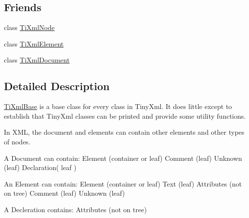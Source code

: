 \subsection*{Friends}
\begin{DoxyCompactItemize}
\item 
class \hyperlink{class_ti_xml_base_a218872a0d985ae30e78c55adc4bdb196}{Ti\-Xml\-Node}
\item 
class \hyperlink{class_ti_xml_base_ab6592e32cb9132be517cc12a70564c4b}{Ti\-Xml\-Element}
\item 
class \hyperlink{class_ti_xml_base_a173617f6dfe902cf484ce5552b950475}{Ti\-Xml\-Document}
\end{DoxyCompactItemize}


\subsection{Detailed Description}
\hyperlink{class_ti_xml_base}{Ti\-Xml\-Base} is a base class for every class in Tiny\-Xml. It does little except to establish that Tiny\-Xml classes can be printed and provide some utility functions.

In X\-M\-L, the document and elements can contain other elements and other types of nodes.

\begin{DoxyVerb}A Document can contain: Element (container or leaf)
                        Comment (leaf)
                        Unknown (leaf)
                        Declaration( leaf )

An Element can contain: Element (container or leaf)
                        Text    (leaf)
                        Attributes (not on tree)
                        Comment (leaf)
                        Unknown (leaf)

A Decleration contains: Attributes (not on tree)
\end{DoxyVerb}
 

